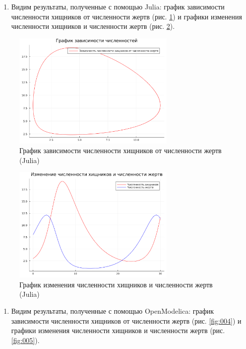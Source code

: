\documentclass[
  12pt,
  a4paper,
]{scrreprt}
\providecommand{\tightlist}{%
  \setlength{\itemsep}{0pt}\setlength{\parskip}{0pt}}
\begin{document}
\begin{enumerate}
\def\labelenumi{\arabic{enumi}.}
\setcounter{enumi}{4}
\tightlist
\item
  Видим результаты, полученные с помощью Julia: график зависимости
  численности хищников от численности жертв (рис. \ref{fig:002}) и
  графики изменения численности хищников и численности жертв (рис.
  \ref{fig:003}).
\end{enumerate}

\begin{figure}
\hypertarget{fig:002}{%
\centering
\includegraphics[width=0.7\textwidth,height=\textheight]{./tex2pdf.-cd896adee9a74d13/image/first_php.png}
\caption{График зависимости численности хищников от численности жертв
(Julia)}\label{fig:002}
}
\end{figure}

\begin{figure}
\hypertarget{fig:003}{%
\centering
\includegraphics[width=0.7\textwidth,height=\textheight]{./tex2pdf.-cd896adee9a74d13/image/first.png}
\caption{График изменения численности хищников и численности жертв
(Julia)}\label{fig:003}
}
\end{figure}

\begin{enumerate}
\def\labelenumi{\arabic{enumi}.}
\setcounter{enumi}{5}
\tightlist
\item
  Видим результаты, полученные с помощью OpenModelica: график
  зависимости численности хищников от численности жертв (рис.
  \ref{fig:004}) и графики изменения численности хищников и численности
  жертв (рис. \ref{fig:005}).
\end{enumerate}
\end{document}
